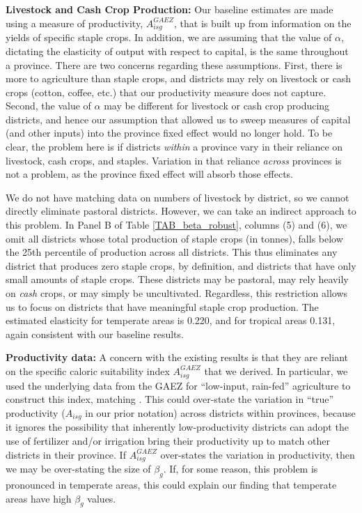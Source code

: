 \documentclass[11pt]{article}
\begin{document}
\textbf{Livestock and Cash Crop Production:} Our baseline estimates are made using a measure of productivity, $A^{GAEZ}_{isg}$, that is built up from information on the yields of specific staple crops. In addition, we are assuming that the value of $\alpha$, dictating the elasticity of output with respect to capital, is the same throughout a province. There are two concerns regarding these assumptions. First, there is more to agriculture than staple crops, and districts may rely on livestock or cash crops (cotton, coffee, etc.) that our productivity measure does not capture. Second, the value of $\alpha$ may be different for livestock or cash crop producing districts, and hence our assumption that allowed us to sweep measures of capital (and other inputs) into the province fixed effect would no longer hold. To be clear, the problem here is if districts \textit{within} a province vary in their reliance on livestock, cash crops, and staples. Variation in that reliance \textit{across} provinces is not a problem, as the province fixed effect will absorb those effects.

We do not have matching data on numbers of livestock by district, so we cannot directly eliminate pastoral districts. However, we can take an indirect approach to this problem. In Panel B of Table \ref{TAB_beta_robust}, columns (5) and (6), we omit all districts whose total production of staple crops (in tonnes), falls below the 25th percentile of production across all districts. This thus eliminates any district that produces zero staple crops, by definition, and districts that have only small amounts of staple crops. These districts may be pastoral, may rely heavily on \textit{cash} crops, or may simply be uncultivated. Regardless, this restriction allows us to focus on districts that have meaningful staple crop production. The estimated elasticity for temperate areas is 0.220, and for tropical areas 0.131, again consistent with our baseline results. 

\vspace{.5cm}\noindent\textbf{Productivity data:} A concern with the existing results is that they are reliant on the specific caloric suitability index $A_{isg}^{GAEZ}$ that we derived. In particular, we used the underlying data from the GAEZ for ``low-input, rain-fed'' agriculture to construct this index, matching \cite{galorozak2016}. This could over-state the variation in ``true'' productivity ($A_{isg}$ in our prior notation) across districts within provinces, because it ignores the possibility that inherently low-productivity districts can adopt the use of fertilizer and/or irrigation bring their productivity up to match other districts in their province. If $A_{isg}^{GAEZ}$ over-states the variation in productivity, then we may be over-stating the size of $\beta_g$. If, for some reason, this problem is pronounced in temperate areas, this could explain our finding that temperate areas have high $\beta_g$ values. 
\end{document}
